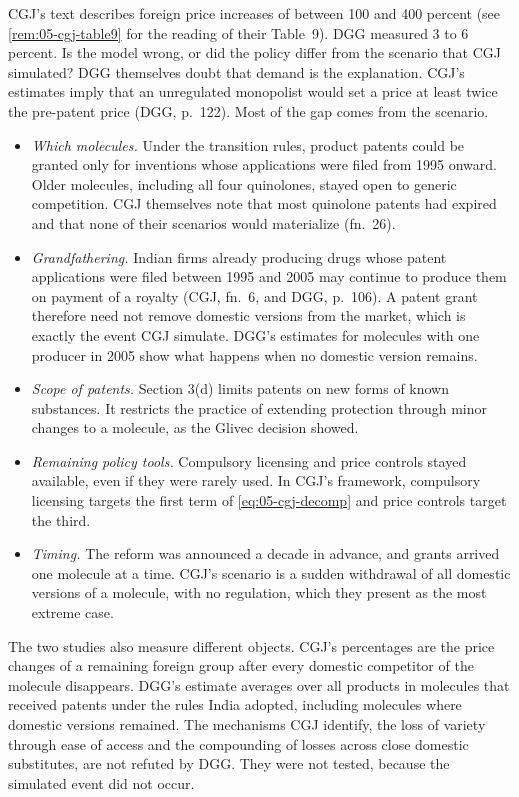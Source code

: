 CGJ's text describes foreign price increases of between 100 and 400 percent (see \cref{rem:05-cgj-table9} for the
reading of their Table~9). DGG measured 3 to 6 percent. Is the model wrong, or did the policy differ from the scenario
that CGJ simulated? DGG themselves doubt that demand is the explanation. CGJ's estimates imply that an unregulated
monopolist would set a price at least twice the pre-patent price (DGG, p.~122). Most of the gap comes from the
scenario.
\begin{itemize}
\item \emph{Which molecules.} Under the transition rules, product patents could be granted only for inventions whose
applications were filed from 1995 onward. Older molecules, including all four quinolones, stayed open to generic
competition. CGJ themselves note that most quinolone patents had expired and that none of their scenarios would
materialize (fn.~26).
\item \emph{Grandfathering.} Indian firms already producing drugs whose patent applications were filed between 1995
and 2005 may continue to produce them on payment of a royalty (CGJ, fn.~6, and DGG, p.~106). A patent grant therefore
need not remove domestic versions from the market, which is exactly the event CGJ simulate. DGG's estimates for
molecules with one producer in 2005 show what happens when no domestic version remains.
\item \emph{Scope of patents.} Section 3(d) limits patents on new forms of known substances. It restricts the practice
of extending protection through minor changes to a molecule, as the Glivec decision showed.
\item \emph{Remaining policy tools.} Compulsory licensing and price controls stayed available, even if they were rarely
used. In CGJ's framework, compulsory licensing targets the first term of \eqref{eq:05-cgj-decomp} and price controls
target the third.
\item \emph{Timing.} The reform was announced a decade in advance, and grants arrived one molecule at a time. CGJ's
scenario is a sudden withdrawal of all domestic versions of a molecule, with no regulation, which they present as the
most extreme case.
\end{itemize}

The two studies also measure different objects. CGJ's percentages are the price changes of a remaining foreign group
after every domestic competitor of the molecule disappears. DGG's estimate averages over all products in molecules that
received patents under the rules India adopted, including molecules where domestic versions remained. The
mechanisms CGJ identify, the loss of variety through ease of access and the compounding of losses across close
domestic substitutes, are not refuted by DGG. They were not tested, because the simulated event did not occur.

